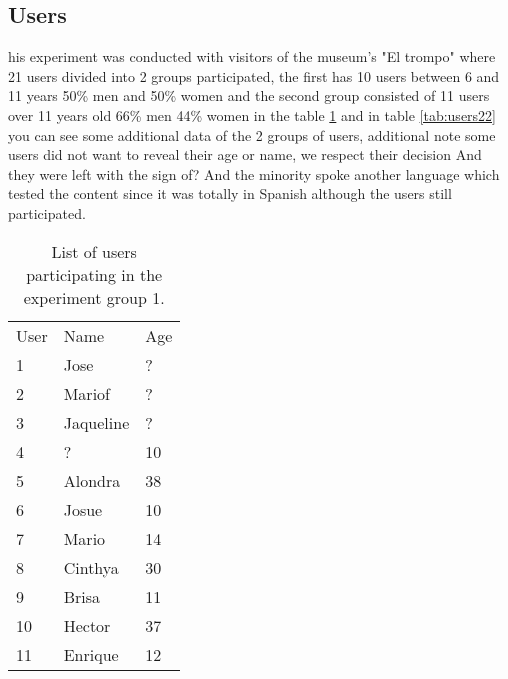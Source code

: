 \subsection{Users}
his experiment was conducted with visitors of the museum’s "El trompo" where 21 users divided into 2 groups participated, the ﬁrst has 10 users between 6 and 11 years 50\% men and 50\% women and the second group consisted of 11 users over 11 years old  66\% men 44\% women in the table \ref{tab:users21} and in table \ref{tab:users22} you can see some additional data of the 2 groups of users, additional note some users did not want to reveal their age or name, we respect their decision And they were left with the sign of? And the minority spoke another language which tested the content since it was totally in Spanish although the users still participated.
\begin{table}
\small
\centering
\captionsetup{font=footnotesize}
\caption{List of users participating in the experiment group 1.}
\label{tab:users21} 
\small
\begin{tabular}{p{3cm} p{3cm} p{3cm} }
\hline{\smallskip}
User & Name	& Age\\
\noalign{\smallskip}\hline\noalign{\smallskip}
\small{	1	}& \small{	Jose 	}& \small{	?	}\\
\small{	2	}& \small{	Mariof	}& \small{	?	}\\
\small{	3	}& \small{	Jaqueline	}& \small{	?	}\\
\small{	4	}& \small{	? 	}& \small{	10	}\\
\small{	5	}& \small{	Alondra	}& \small{	38	}\\
\small{	6	}& \small{	Josue 	}& \small{	10	}\\
\small{	7	}& \small{	Mario	}& \small{	14	}\\
\small{	8	}& \small{	Cinthya	}& \small{	30	}\\
\small{	9	}& \small{	Brisa	}& \small{	11	}\\
\small{	10	}& \small{	Hector 	}& \small{	37	}\\
\small{	11	}& \small{	Enrique	}& \small{	12	}\\
\hline
\end{tabular}
\end{table}
 
